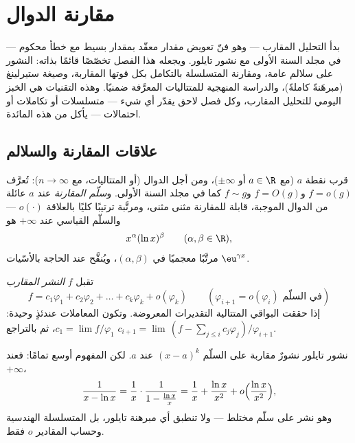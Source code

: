 \chapter{مقارنة الدوال}\label{ch:b2:comparison}

بدأ التحليل المقارب --- وهو فنّ تعويض مقدار معقّد
بمقدار بسيط مع خطأ محكوم --- في مجلد السنة الأولى
مع نشور تايلور. ويجعله هذا الفصل تخصّصًا قائمًا
بذاته: النشور على سلالم عامة، ومقارنة المتسلسلة بالتكامل
بكل قوتها المقاربة، وصيغة ستيرلينغ (مبرهَنةً
كاملةً)، والدراسة المنهجية للمتتاليات المعرَّفة ضمنيًا. وهذه
التقنيات هي الخبز اليومي للتحليل المقارب، وكل فصل لاحق يقدّر
أي شيء --- متسلسلات أو تكاملات أو احتمالات --- يأكل من
هذه المائدة.

\section{علاقات المقارنة والسلالم}

\begin{definition}\label{def:b2:comparison:landau}
قرب نقطة $a$ (مع $a \in \R$ أو $\pm\infty$)، ومن أجل الدوال (أو
المتتاليات، مع $n \to \infty$): تُعرَّف $f = o(g)$ و$f = O(g)$ و$f \sim g$
كما في مجلد السنة الأولى. و\emph{سلّم المقارنة}
عند $a$ عائلة من الدوال الموجبة، قابلة للمقارنة مثنى مثنى،
ومرتَّبة ترتيبًا كليًا بالعلاقة $o(\cdot)$ ---
والسلّم القياسي عند $+\infty$ هو
\[
x^{\alpha} (\ln x)^{\beta}
\qquad (\alpha, \beta \in \R),
\]
مرتَّبًا معجميًا في $(\alpha, \beta)$، ويُنقَّح عند الحاجة
بالأسّيات $\eu^{\gamma x}$.
\end{definition}

\begin{definition}\label{def:b2:comparison:expansion}
تقبل $f$ \emph{النشر المقارب}
\[
f = c_1 \varphi_1 + c_2\varphi_2 + \dots + c_k \varphi_k +
o(\varphi_k)
\qquad (\varphi_{i+1} = o(\varphi_i) \text{ في السلّم})
\]
إذا حققت البواقي المتتالية التقديرات المعروضة. وتكون
المعاملات عندئذٍ وحيدة: $c_1 = \lim f/\varphi_1$، ثم
بالتراجع $c_{i+1} = \lim\,(f - \sum_{j \leq i}
c_j\varphi_j)/\varphi_{i+1}$.
\end{definition}

\begin{example}
نشور تايلور نشورٌ مقاربة على السلّم $(x -
a)^k$ عند $a$. لكن المفهوم أوسع تمامًا: فعند $+\infty$،
\[
\frac{1}{x - \ln x}
= \frac1x \cdot \frac{1}{1 - \frac{\ln x}{x}}
= \frac1x + \frac{\ln x}{x^2} + o\Bigl(\frac{\ln x}{x^2}\Bigr),
\]
وهو نشر على سلّم مختلط --- ولا تنطبق أي مبرهنة تايلور،
بل المتسلسلة الهندسية وحساب المقادير $o$ فقط.
\end{example}

